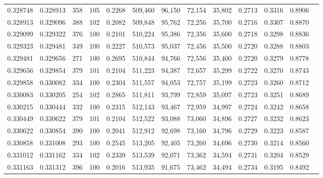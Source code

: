 \begin{tabular}{rrrrrrrrrrrrr}
0.328748 & 0.328913 &   358 & 105 &                                     0.2268 & 509,460 &  96,150 &  72,154 &  35,802 & 0.2713 & 0.3316 & 0.8906 \\
0.328913 & 0.329096 &   388 & 102 &                                     0.2082 & 509,848 &  95,762 &  72,256 &  35,700 & 0.2716 & 0.3307 & 0.8870 \\
0.329099 & 0.329322 &   376 & 100 &                                     0.2101 & 510,224 &  95,386 &  72,356 &  35,600 & 0.2718 & 0.3298 & 0.8836 \\
0.329323 & 0.329481 &   349 & 100 &                                     0.2227 & 510,573 &  95,037 &  72,456 &  35,500 & 0.2720 & 0.3288 & 0.8803 \\
0.329481 & 0.329656 &   271 & 100 &                                     0.2695 & 510,844 &  94,766 &  72,556 &  35,400 & 0.2720 & 0.3279 & 0.8778 \\
0.329656 & 0.329854 &   379 & 101 &                                     0.2104 & 511,223 &  94,387 &  72,657 &  35,299 & 0.2722 & 0.3270 & 0.8743 \\
0.329858 & 0.330082 &   334 & 100 &                                     0.2304 & 511,557 &  94,053 &  72,757 &  35,199 & 0.2723 & 0.3260 & 0.8712 \\
0.330083 & 0.330205 &   254 & 102 &                                     0.2865 & 511,811 &  93,799 &  72,859 &  35,097 & 0.2723 & 0.3251 & 0.8689 \\
0.330215 & 0.330444 &   332 & 100 &                                     0.2315 & 512,143 &  93,467 &  72,959 &  34,997 & 0.2724 & 0.3242 & 0.8658 \\
0.330449 & 0.330622 &   379 & 101 &                                     0.2104 & 512,522 &  93,088 &  73,060 &  34,896 & 0.2727 & 0.3232 & 0.8623 \\
0.330622 & 0.330854 &   390 & 100 &                                     0.2041 & 512,912 &  92,698 &  73,160 &  34,796 & 0.2729 & 0.3223 & 0.8587 \\
0.330858 & 0.331008 &   293 & 100 &                                     0.2545 & 513,205 &  92,405 &  73,260 &  34,696 & 0.2730 & 0.3214 & 0.8560 \\
0.331012 & 0.331162 &   334 & 102 &                                     0.2339 & 513,539 &  92,071 &  73,362 &  34,594 & 0.2731 & 0.3204 & 0.8529 \\
0.331163 & 0.331312 &   396 & 100 &                                     0.2016 & 513,935 &  91,675 &  73,462 &  34,494 & 0.2734 & 0.3195 & 0.8492 \\

\end{tabular}
